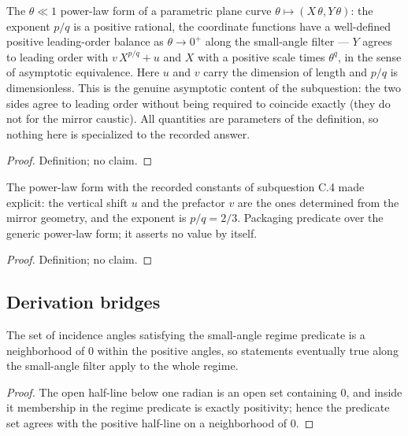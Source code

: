 \begin{definition}
\label{def:IPhO2026Problems_problem_IPhO_2026_2_C_4:CausticPowerLawForm}
The $\theta \ll 1$ power-law form of a parametric plane curve
$\theta \mapsto (X\,\theta, Y\,\theta)$: the exponent $p/q$ is a positive
rational, the coordinate functions have a well-defined positive
leading-order balance as $\theta \to 0^{+}$ along the small-angle filter ---
$Y$ agrees to leading order with $v\,X^{p/q} + u$ and $X$ with a positive
scale times $\theta^{q}$, in the sense of asymptotic equivalence.  Here $u$
and $v$ carry the dimension of length and $p/q$ is dimensionless.  This is
the genuine asymptotic content of the subquestion: the two sides agree to
leading order without being required to coincide exactly (they do not for
the mirror caustic).  All quantities are parameters of the definition, so
nothing here is specialized to the recorded answer.
\end{definition}
\begin{proof}
Definition; no claim.
\end{proof}

\begin{definition}
\label{def:IPhO2026Problems_problem_IPhO_2026_2_C_4:SatisfiesCausticPowerLaw}
The power-law form with the recorded constants of subquestion C.4 made
explicit: the vertical shift $u$ and the prefactor $v$ are the ones
determined from the mirror geometry, and the exponent is $p/q = 2/3$.
Packaging predicate over the generic power-law form; it asserts no value by
itself.
\end{definition}
\begin{proof}
Definition; no claim.
\end{proof}

\subsection*{Derivation bridges}

\begin{lemma}
\label{lem:IPhO2026Problems_problem_IPhO_2026_2_C_4:smallAngleRegime_mem_filter}
The set of incidence angles satisfying the small-angle regime predicate is a
neighborhood of $0$ within the positive angles, so statements eventually
true along the small-angle filter apply to the whole regime.
\end{lemma}
\begin{proof}
The open half-line below one radian is an open set containing $0$, and
inside it membership in the regime predicate is exactly positivity; hence
the predicate set agrees with the positive half-line on a neighborhood of
$0$.
\end{proof}

